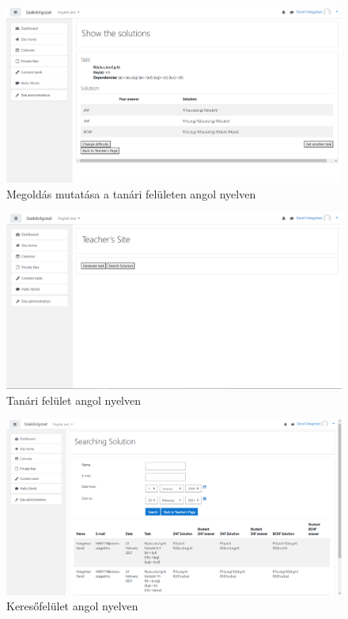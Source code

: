 \begin{figure}
    \centering
    \includegraphics[scale=0.4]{Fejezetek/Images/english04.png}
    \caption{Megoldás mutatása a tanári felületen angol nyelven}
\end{figure}
\begin{figure}
    \centering
    \includegraphics[scale=0.4]{Fejezetek/Images/english05.png}
    \caption{Tanári felület angol nyelven}
\end{figure}
\begin{figure}
    \centering
    \includegraphics[scale=0.4]{Fejezetek/Images/englis06.png}
    \caption{Keresőfelület angol nyelven}
\end{figure}